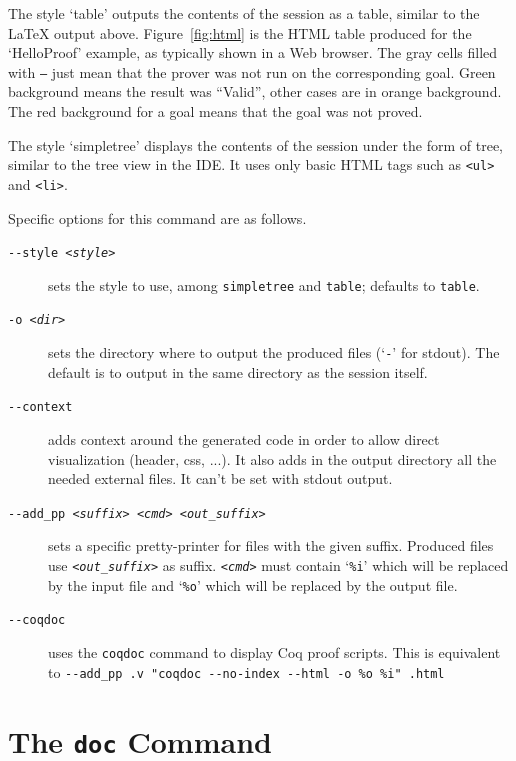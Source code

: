 The style `table' outputs the contents of the session as a table,
similar to the LaTeX output above. Figure~\ref{fig:html} is the HTML
table produced for the `HelloProof' example, as typically shown in a
Web browser. The gray cells filled with \texttt{---} just mean that
the prover was not run on the corresponding goal. Green background
means the result was ``Valid'', other cases are in orange
background. The red background for a goal means that the goal was not
proved.

The style `simpletree' displays the contents of the session under the
form of tree, similar to the tree view in the IDE. It uses only basic
HTML tags such as \verb|<ul>| and \verb|<li>|.

Specific options for this command are as follows.
\begin{description}
\item[\texttt{-{}-style \textsl{<style>}}] sets the style to use, among
  \texttt{simpletree} and \texttt{table}; defaults to
  \texttt{table}.

\item[\texttt{-o \textsl{<dir>}}] sets the directory where to output
  the produced files (`\texttt{-}' for stdout). The default is to output
  in the same directory as the session itself.

\item[\texttt{-{}-context}] adds context around the generated code in
  order to allow direct visualization (header, css, ...). It also adds
  in the output directory all the needed external files. It can't be set with
  stdout output.

\item[\texttt{-{}-add\_pp \textsl{<suffix>} \textsl{<cmd>} \textsl{<out\_suffix>}}] sets a specific
  pretty-printer for files with the given suffix. Produced files use
  \texttt{\textsl{<out\_suffix>}} as suffix. \texttt{\textsl{<cmd>}} must contain
  `\texttt{\%i}' which will be replaced by the input file and
  `\texttt{\%o}' which will be replaced by the output file.

\item[\texttt{-{}-coqdoc}] uses the \verb|coqdoc| command to display Coq proof
  scripts. This is equivalent to \texttt{-{}-add\_pp .v "coqdoc
    -{}-no-index -{}-html -o \%o \%i" .html}

\end{description}


\section{The \texttt{doc} Command}
\label{sec:why3doc}

